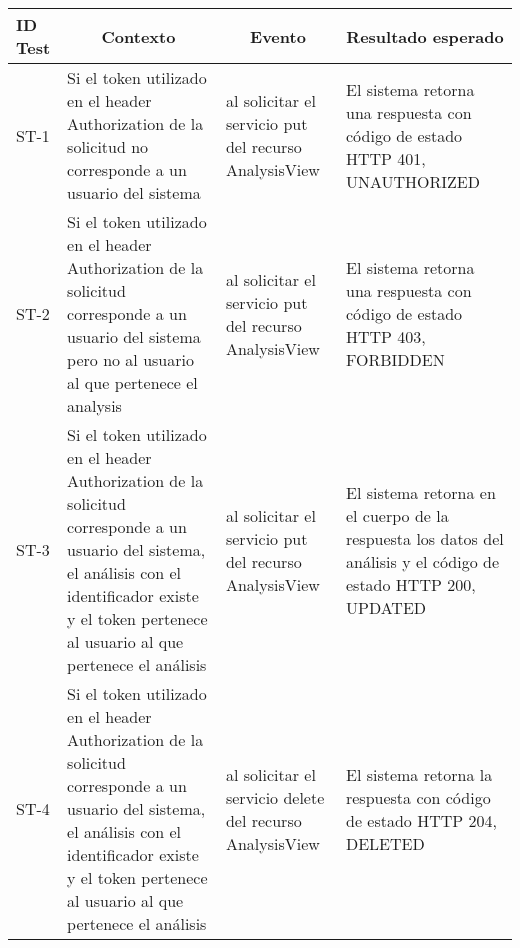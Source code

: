   \begin{longtable}{|p{1cm}|p{4cm}|p{4cm}|p{4cm}| }
  	
  	\hline
  	\rowcolor[gray]{0.9} 
  	\textbf{ID Test} & \multicolumn{1}{|c|}{\textbf{Contexto}} & \multicolumn{1}{c|}{\textbf{Evento}} & \multicolumn{1}{c|}{\textbf{Resultado esperado}} \\
  	\hline
  	\endhead
  	ST-1 & Si el token utilizado en el header Authorization de la solicitud no corresponde a un usuario del sistema  & al solicitar el servicio put del recurso AnalysisView & El sistema retorna una respuesta con código de estado HTTP 401, UNAUTHORIZED\\
  	\hline
  	ST-2 & Si el token utilizado en el header Authorization de la solicitud corresponde a un usuario del sistema pero no al usuario al que pertenece el analysis & al solicitar el servicio put del recurso AnalysisView & El sistema retorna una respuesta con código de estado HTTP 403, FORBIDDEN\\
  	\hline
  	ST-3 & Si el token utilizado en el header Authorization de la solicitud corresponde a un usuario del sistema, el análisis con el identificador existe y el token pertenece al usuario al que pertenece el análisis & al solicitar el servicio put del recurso AnalysisView & El sistema retorna en el cuerpo de la respuesta los datos del análisis y el código de estado HTTP 200, UPDATED\\
  	\hline
  	ST-4 & Si el token utilizado en el header Authorization de la solicitud corresponde a un usuario del sistema, el análisis con el identificador existe y el token pertenece al usuario al que pertenece el análisis & al solicitar el servicio delete del recurso AnalysisView & El sistema retorna la respuesta con código de estado HTTP 204, DELETED\\
  	\hline
  	
  \end{longtable}
  
